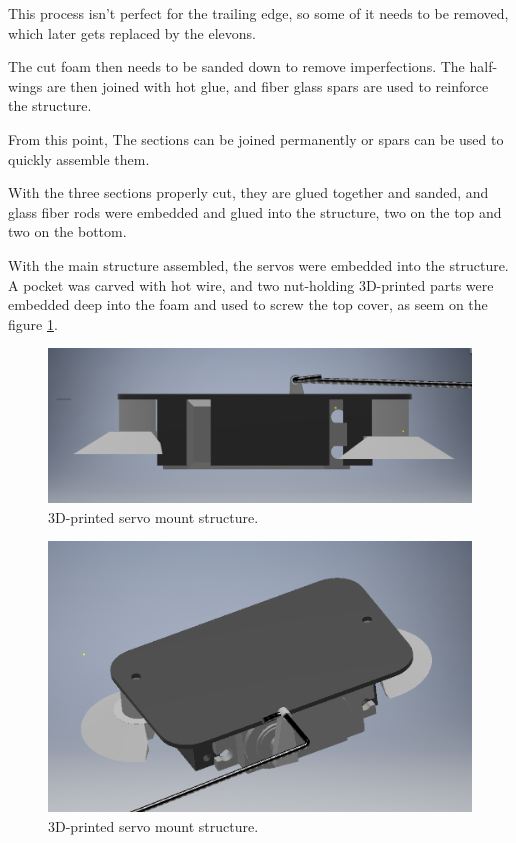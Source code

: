 This process isn't perfect for the trailing edge, so some of it needs to be removed, which later gets replaced by the elevons.

The cut foam then needs to be sanded down to remove imperfections.
The half-wings are then joined with hot glue, and fiber glass spars are used to reinforce the structure.


From this point, The sections can be joined permanently or spars can be used to quickly assemble them.


With the three sections properly cut, they are glued together and sanded, and glass fiber rods were embedded and glued into the structure, two on the top and two on the bottom.

With the main structure assembled, the servos were embedded into the structure. A pocket was carved with hot wire, and two nut-holding 3D-printed parts were embedded deep into the foam and used to screw the top cover, as seem on the figure \ref{fig:servomount}.


\begin{figure}[H]
\centering
  \includegraphics[width=\linewidth]{figs/nutholder1.png}
  \caption{3D-printed servo mount structure.}
  \label{fig:servomount}
\end{figure}


\begin{figure}[H]
\centering
  \includegraphics[width=\linewidth]{figs/nutholder2.png}
  \caption{3D-printed servo mount structure.}
  \label{fig:servomount2}
\end{figure}


